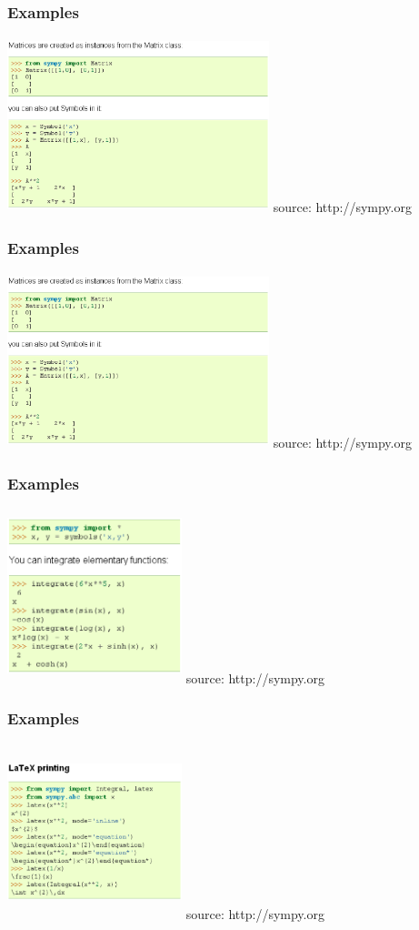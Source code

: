 \documentclass[dvips]{beamer}
\begin{document}
\begin{frame}
\frametitle{Examples}
\includegraphics[height=2in,width=3in]{ex2.ps}\newline
\tiny{source: http://sympy.org}
\end{frame}


\begin{frame}
\frametitle{Examples}
\includegraphics[height=2in,width=3in]{ex3.ps}\newline
\tiny{source: http://sympy.org}
\end{frame}

\begin{frame}
\frametitle{Examples}
\includegraphics[height=2in,width=2in]{ex4.ps}\newline
\tiny{source: http://sympy.org}
\end{frame}

\begin{frame}
\frametitle{Examples}
\includegraphics[height=2in,width=2in]{ex5.ps}\newline
\tiny{source: http://sympy.org}
\end{frame}
\end{document}
